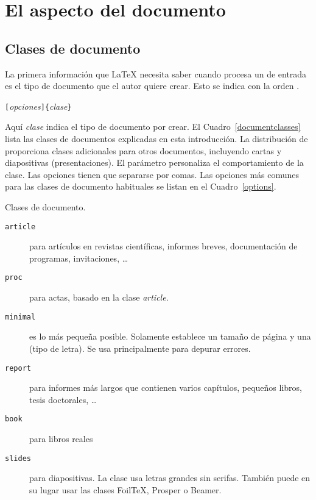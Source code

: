 \section{El aspecto del documento}
 
\subsection {Clases de documento}\label{sec:documentclass}

La primera información que \LaTeX{} necesita saber cuando procesa un \filenomo{} de entrada es el tipo de documento que el autor quiere crear. Esto se indica con la orden .
\begin{lscommand}
\verb|[|\emph{opciones}\verb|]{|\emph{clase}\verb|}|
\end{lscommand}
%
Aquí \emph{clase} indica el tipo de documento por crear.  El Cuadro~\ref{documentclasses} lista las clases de documentos explicadas en esta introducción.  La distribución de \LaTeXe{} proporciona clases adicionales para otros documentos, incluyendo cartas y diapositivas (presentaciones).  El parámetro \emph{} personaliza el comportamiento de la clase.  Las opciones tienen que separarse por comas.  Las opciones más comunes para las clases de documento habituales se listan en el Cuadro~\ref{options}.

\begin{table}[!bp]
\caption{Clases de documento.} \label{documentclasses}
\begin{lined}{\textwidth}
\begin{description} 
  \item [\normalfont\texttt{article}] para artículos en revistas científicas, informes breves, documentación de programas, invitaciones, \ldots {}
  \item [\normalfont\texttt{proc}] para actas, basado en la clase  \emph{article}.  
  \item [\normalfont\texttt{minimal}] es lo más pequeña posible. Solamente establece un tamaño de página y una \fontnomo{} (tipo de letra).  Se usa principalmente para depurar errores. 
  \item [\normalfont\texttt{report}] para informes más largos que  contienen varios capítulos, pequeños libros, tesis doctorales,  \ldots {}
  \item [\normalfont\texttt{book}] para libros reales 
  \item [\normalfont\texttt{slides}] para diapositivas.  La clase usa letras grandes sin serifas.  También puede en su lugar usar las clases Foil\TeX{}, Prosper o Beamer. 
\end{description}
\end{lined}
\end{table}

